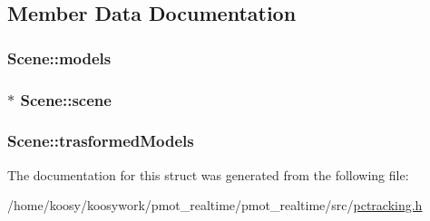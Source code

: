 \subsection{\-Member \-Data \-Documentation}
\hypertarget{struct_scene_a0483d18d0b67d7655df8d7cb338606de}{
\subsubsection[{models}]{ {\bf \-Scene\-::models}}}\label{struct_scene_a0483d18d0b67d7655df8d7cb338606de}
\hypertarget{struct_scene_ac57f5d6c6d10c2fa5ff08b7f3834dc26}{
\subsubsection[{scene}]{$\ast$ {\bf \-Scene\-::scene}}}\label{struct_scene_ac57f5d6c6d10c2fa5ff08b7f3834dc26}
\hypertarget{struct_scene_a4c6f65a07e6a8ffe5d99fa6a6eff846a}{
\subsubsection[{trasformed\-Models}]{ {\bf \-Scene\-::trasformed\-Models}}}\label{struct_scene_a4c6f65a07e6a8ffe5d99fa6a6eff846a}


\-The documentation for this struct was generated from the following file\-:\begin{DoxyCompactItemize}
\item 
/home/koosy/koosywork/pmot\-\_\-realtime/pmot\-\_\-realtime/src/\hyperlink{pctracking_8h}{pctracking.\-h}\end{DoxyCompactItemize}
